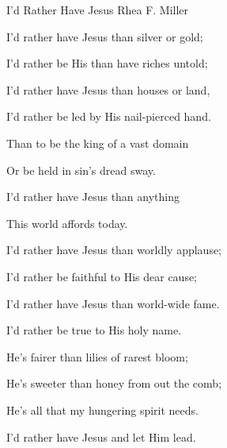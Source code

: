 \documentclass[12pt]{book}
\begin{document}
\begin{song}{I'd Rather Have Jesus}{}
  {\SBPubDom}
  {Rhea F. Miller}
  {}
  {}

  \begin{SBVerse}
    I'd rather have Jesus than silver or gold;

    I'd rather be His than have riches untold;

    I'd rather have Jesus than houses or land,

    I'd rather be led by His nail-pierced hand.
  \end{SBVerse}

  \begin{SBOpGroup}
    Than to be the king of a vast domain

    Or be held in sin's dread sway.

    I'd rather have Jesus than anything

    This world affords today.
  \end{SBOpGroup}

  \begin{SBVerse}
    I'd rather have Jesus than worldly applause;

    I'd rather be faithful to His dear cause;

    I'd rather have Jesus than world-wide fame.

    I'd rather be true to His holy name.
  \end{SBVerse}

  \begin{SBVerse}
    He's fairer than lilies of rarest bloom;

    He's sweeter than honey from out the comb;

    He's all that my hungering spirit needs.

    I'd rather have Jesus and let Him lead.
  \end{SBVerse}
\end{song}
\end{document}
